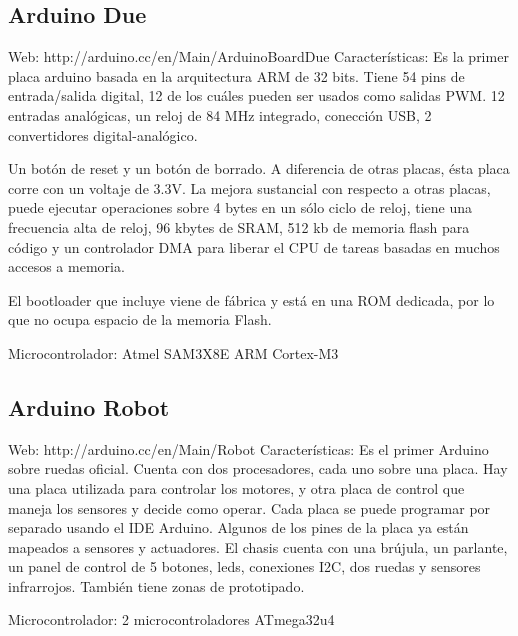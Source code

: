 \subsection{Arduino Due}
Web:
http://arduino.cc/en/Main/ArduinoBoardDue
Características:
Es la primer placa arduino basada en la arquitectura ARM de 32 bits.
Tiene 54 pins de entrada/salida digital, 12 de los cuáles pueden ser usados como salidas PWM.
12 entradas analógicas, un reloj de 84 MHz integrado, conección USB, 2 convertidores digital-analógico.

Un botón de reset y un botón de borrado.
A diferencia de otras placas, ésta placa corre con un voltaje de 3.3V.
La mejora sustancial con respecto a otras placas, puede ejecutar operaciones sobre 4 bytes en un sólo ciclo de reloj,
tiene una frecuencia alta de reloj, 96 kbytes de SRAM, 512 kb de memoria flash para código y
un controlador DMA para liberar el CPU de tareas basadas en muchos accesos a memoria.

El bootloader que incluye viene de fábrica y está en una ROM dedicada, por lo que no ocupa espacio de la memoria Flash.

Microcontrolador: Atmel SAM3X8E ARM Cortex-M3

\subsection{Arduino Robot}
Web:
http://arduino.cc/en/Main/Robot
Características:
Es el primer Arduino sobre ruedas oficial.
Cuenta con dos procesadores, cada uno sobre una placa.
Hay una placa utilizada para controlar los motores, y otra placa de control que maneja los
sensores y decide como operar.
Cada placa se puede programar por separado usando el IDE Arduino.
Algunos de los pines de la placa ya están mapeados a sensores y actuadores.
  El chasis cuenta con una brújula, un parlante, un panel de control de 5 botones, leds, conexiones I2C,
dos ruedas y sensores infrarrojos.
  También tiene zonas de prototipado.

Microcontrolador: 2 microcontroladores ATmega32u4


